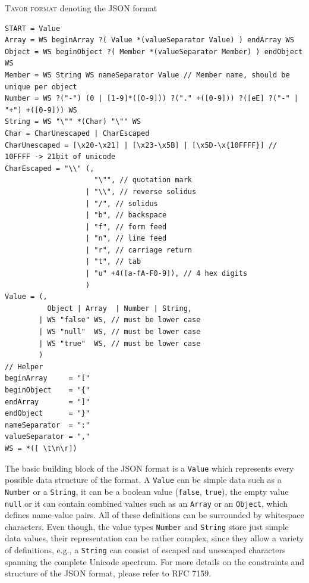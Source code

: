 \begin{listing}[H]
\caption{\textsc{Tavor format} denoting the JSON format}
\label{lst:tavor-json-format}
\begin{verbatim}
START = Value
Array = WS beginArray ?( Value *(valueSeparator Value) ) endArray WS
Object = WS beginObject ?( Member *(valueSeparator Member) ) endObject WS
Member = WS String WS nameSeparator Value // Member name, should be unique per object
Number = WS ?("-") (0 | [1-9]*([0-9])) ?("." +([0-9])) ?([eE] ?("-" | "+") +([0-9])) WS
String = WS "\"" *(Char) "\"" WS
Char = CharUnescaped | CharEscaped
CharUnescaped = [\x20-\x21] | [\x23-\x5B] | [\x5D-\x{10FFFF}] // 10FFFF -> 21bit of unicode
CharEscaped = "\\" (,
                     "\"", // quotation mark
                   | "\\", // reverse solidus
                   | "/", // solidus
                   | "b", // backspace
                   | "f", // form feed
                   | "n", // line feed
                   | "r", // carriage return
                   | "t", // tab
                   | "u" +4([a-fA-F0-9]), // 4 hex digits
                   )
Value = (,
          Object | Array  | Number | String,
        | WS "false" WS, // must be lower case
        | WS "null"  WS, // must be lower case
        | WS "true"  WS, // must be lower case
        )
// Helper
beginArray     = "["
beginObject    = "{"
endArray       = "]"
endObject      = "}"
nameSeparator  = ":"
valueSeparator = ","
WS = *([ \t\n\r])
\end{verbatim}
\end{listing}

The basic building block of the JSON format is a \texttt{Value} which represents every possible data structure of the format. A \texttt{Value} can be simple data such as a \texttt{Number} or a \texttt{String}, it can be a boolean value (\texttt{false}, \texttt{true}), the empty value \texttt{null} or it can contain combined values such as an \texttt{Array} or an \texttt{Object}, which defines name-value pairs. All of these definitions can be surrounded by whitespace characters. Even though, the value types \texttt{Number} and \texttt{String} store just simple data values, their representation can be rather complex, since they allow a variety of definitions, e.g., a \texttt{String} can consist of escaped and unescaped characters spanning the complete Unicode spectrum. For more details on the constraints and structure of the JSON format, please refer to RFC 7159.

